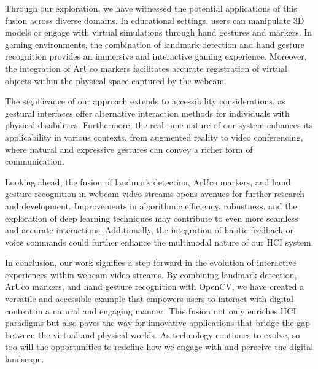\documentclass[journal]{IEEEtran}
\begin{document}
Through our exploration, we have witnessed the potential applications of this fusion across diverse domains. In educational settings, 
users can manipulate 3D models or engage with virtual simulations through hand gestures and markers. In gaming environments, 
the combination of landmark detection and hand gesture recognition provides an immersive and interactive gaming experience. 
Moreover, the integration of ArUco markers facilitates accurate registration of virtual objects within the physical space captured 
by the webcam.

The significance of our approach extends to accessibility considerations, as gestural interfaces offer alternative interaction methods 
for individuals with physical disabilities. Furthermore, the real-time nature of our system enhances its applicability in various contexts, 
from augmented reality to video conferencing, where natural and expressive gestures can convey a richer form of communication.

Looking ahead, the fusion of landmark detection, ArUco markers, and hand gesture recognition in webcam video streams opens avenues 
for further research and development. Improvements in algorithmic efficiency, robustness, and the exploration of deep learning 
techniques may contribute to even more seamless and accurate interactions. Additionally, the integration of haptic feedback or 
voice commands could further enhance the multimodal nature of our HCI system.

In conclusion, our work signifies a step forward in the evolution of interactive experiences within webcam video streams. By combining 
landmark detection, ArUco markers, and hand gesture recognition with OpenCV, we have created a versatile and accessible example 
that empowers users to interact with digital content in a natural and engaging manner. This fusion not only enriches HCI paradigms 
but also paves the way for innovative applications that bridge the gap between the virtual and physical worlds. As technology continues 
to evolve, so too will the opportunities to redefine how we engage with and perceive the digital landscape.





\end{document}
